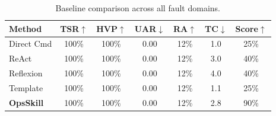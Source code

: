 \begin{table}[t]
\centering
\caption{Baseline comparison across all fault domains.}
\label{tab:baseline-comparison}
\small
\begin{tabular}{lcccccc}
\toprule
\textbf{Method} & \textbf{TSR}$\uparrow$ & \textbf{HVP}$\uparrow$ & \textbf{UAR}$\downarrow$ & \textbf{RA}$\uparrow$ & \textbf{TC}$\downarrow$ & \textbf{Score}$\uparrow$ \\
\midrule
Direct Cmd & 100\% & 100\% & 0.00 & 12\% & 1.0 & 25\% \\
ReAct & 100\% & 100\% & 0.00 & 12\% & 3.0 & 40\% \\
Reflexion & 100\% & 100\% & 0.00 & 12\% & 4.0 & 40\% \\
Template & 100\% & 100\% & 0.00 & 12\% & 1.1 & 25\% \\
\textbf{OpsSkill} & 100\% & 100\% & 0.00 & 12\% & 2.8 & 90\% \\
\bottomrule
\end{tabular}
\end{table}